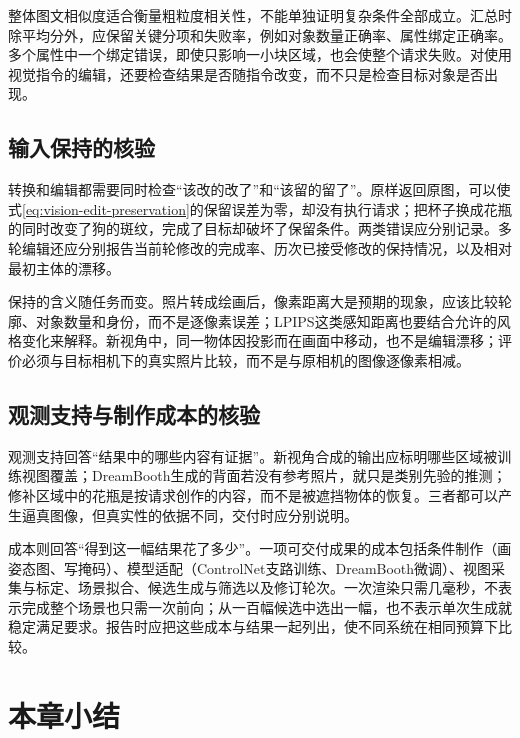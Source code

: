 整体图文相似度适合衡量粗粒度相关性，不能单独证明复杂条件全部成立。汇总时除平均分外，应保留关键分项和失败率，例如对象数量正确率、属性绑定正确率。多个属性中一个绑定错误，即使只影响一小块区域，也会使整个请求失败。对使用视觉指令的编辑，还要检查结果是否随指令改变，而不只是检查目标对象是否出现。

\subsection{输入保持的核验}
\label{sec:vision-generation-change-check}

转换和编辑都需要同时检查“该改的改了”和“该留的留了”。原样返回原图，可以使式\eqref{eq:vision-edit-preservation}的保留误差为零，却没有执行请求；把杯子换成花瓶的同时改变了狗的斑纹，完成了目标却破坏了保留条件。两类错误应分别记录。多轮编辑还应分别报告当前轮修改的完成率、历次已接受修改的保持情况，以及相对最初主体的漂移。

保持的含义随任务而变。照片转成绘画后，像素距离大是预期的现象，应该比较轮廓、对象数量和身份，而不是逐像素误差；LPIPS这类感知距离也要结合允许的风格变化来解释。新视角中，同一物体因投影而在画面中移动，也不是编辑漂移；评价必须与目标相机下的真实照片比较，而不是与原相机的图像逐像素相减。

\subsection{观测支持与制作成本的核验}
\label{sec:vision-generation-costs}

观测支持回答“结果中的哪些内容有证据”。新视角合成的输出应标明哪些区域被训练视图覆盖；DreamBooth生成的背面若没有参考照片，就只是类别先验的推测；修补区域中的花瓶是按请求创作的内容，而不是被遮挡物体的恢复。三者都可以产生逼真图像，但真实性的依据不同，交付时应分别说明。

成本则回答“得到这一幅结果花了多少”。一项可交付成果的成本包括条件制作（画姿态图、写掩码）、模型适配（ControlNet支路训练、DreamBooth微调）、视图采集与标定、场景拟合、候选生成与筛选以及修订轮次。一次渲染只需几毫秒，不表示完成整个场景也只需一次前向；从一百幅候选中选出一幅，也不表示单次生成就稳定满足要求。报告时应把这些成本与结果一起列出，使不同系统在相同预算下比较。

\section{本章小结}
\label{sec:vision-generation-summary}

